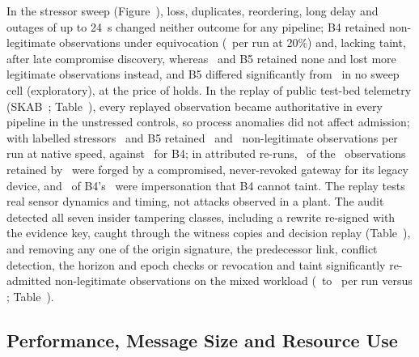 In the stressor sweep (Figure~), loss, duplicates, reordering, long delay and outages of up to 24~s changed neither outcome for any pipeline; B4 retained non-legitimate observations under equivocation (\VSwequivocationBFourOneTwenty\ per run at 20\%) and, lacking taint, after late compromise discovery, whereas \sys\ and B5 retained none and lost more legitimate observations instead, and B5 differed significantly from \sys\ in no sweep cell (exploratory), at the price of holds. In the replay of public test-bed telemetry (SKAB~\cite{katser2020skab}; Table~), every replayed observation became authoritative in every pipeline in the unstressed controls, so process anomalies did not affect admission; with labelled stressors \sys\ and B5 retained \VRpOnePBTInonlegitauth\ and \VRpOneBFivenonlegitauth\ non-legitimate observations per run at native speed, against \VRpOneBFournonlegitauth\ for B4; in attributed re-runs, \VRpResPBTIgw\ of the \VRpResPBTItotal\ observations retained by \sys\ were forged by a compromised, never-revoked gateway for its legacy device, and \VRpResBFourimp\ of B4's \VRpResBFourtotal\ were impersonation that B4 cannot taint. The replay tests real sensor dynamics and timing, not attacks observed in a plant. The audit detected all seven insider tampering classes, including a rewrite re-signed with the evidence key, caught through the witness copies and decision replay (Table~), and removing any one of the origin signature, the predecessor link, conflict detection, the horizon and epoch checks or revocation and taint significantly re-admitted non-legitimate observations on the mixed workload (\RAblnoprevlinknonlegitauth\ to \RAblnorevocationnonlegitauth\ per run versus \RAblfullnonlegitauth; Table~).

\subsection{Performance, Message Size and Resource Use}\label{sec:res-perf}

